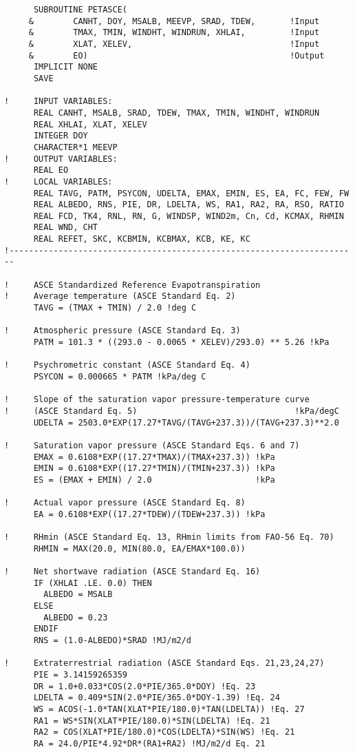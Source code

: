 \begin{verbatim}
      SUBROUTINE PETASCE(
     &        CANHT, DOY, MSALB, MEEVP, SRAD, TDEW,       !Input
     &        TMAX, TMIN, WINDHT, WINDRUN, XHLAI,         !Input
     &        XLAT, XELEV,                                !Input
     &        EO)                                         !Output
      IMPLICIT NONE
      SAVE

!     INPUT VARIABLES:
      REAL CANHT, MSALB, SRAD, TDEW, TMAX, TMIN, WINDHT, WINDRUN
      REAL XHLAI, XLAT, XELEV
      INTEGER DOY
      CHARACTER*1 MEEVP
!     OUTPUT VARIABLES:
      REAL EO
!     LOCAL VARIABLES:
      REAL TAVG, PATM, PSYCON, UDELTA, EMAX, EMIN, ES, EA, FC, FEW, FW
      REAL ALBEDO, RNS, PIE, DR, LDELTA, WS, RA1, RA2, RA, RSO, RATIO
      REAL FCD, TK4, RNL, RN, G, WINDSP, WIND2m, Cn, Cd, KCMAX, RHMIN
      REAL WND, CHT
      REAL REFET, SKC, KCBMIN, KCBMAX, KCB, KE, KC
!-----------------------------------------------------------------------

!     ASCE Standardized Reference Evapotranspiration
!     Average temperature (ASCE Standard Eq. 2)
      TAVG = (TMAX + TMIN) / 2.0 !deg C

!     Atmospheric pressure (ASCE Standard Eq. 3)
      PATM = 101.3 * ((293.0 - 0.0065 * XELEV)/293.0) ** 5.26 !kPa

!     Psychrometric constant (ASCE Standard Eq. 4)
      PSYCON = 0.000665 * PATM !kPa/deg C

!     Slope of the saturation vapor pressure-temperature curve
!     (ASCE Standard Eq. 5)                                !kPa/degC
      UDELTA = 2503.0*EXP(17.27*TAVG/(TAVG+237.3))/(TAVG+237.3)**2.0

!     Saturation vapor pressure (ASCE Standard Eqs. 6 and 7)
      EMAX = 0.6108*EXP((17.27*TMAX)/(TMAX+237.3)) !kPa
      EMIN = 0.6108*EXP((17.27*TMIN)/(TMIN+237.3)) !kPa
      ES = (EMAX + EMIN) / 2.0                     !kPa

!     Actual vapor pressure (ASCE Standard Eq. 8)
      EA = 0.6108*EXP((17.27*TDEW)/(TDEW+237.3)) !kPa

!     RHmin (ASCE Standard Eq. 13, RHmin limits from FAO-56 Eq. 70)
      RHMIN = MAX(20.0, MIN(80.0, EA/EMAX*100.0))

!     Net shortwave radiation (ASCE Standard Eq. 16)
      IF (XHLAI .LE. 0.0) THEN
        ALBEDO = MSALB
      ELSE
        ALBEDO = 0.23
      ENDIF
      RNS = (1.0-ALBEDO)*SRAD !MJ/m2/d

!     Extraterrestrial radiation (ASCE Standard Eqs. 21,23,24,27)
      PIE = 3.14159265359
      DR = 1.0+0.033*COS(2.0*PIE/365.0*DOY) !Eq. 23
      LDELTA = 0.409*SIN(2.0*PIE/365.0*DOY-1.39) !Eq. 24
      WS = ACOS(-1.0*TAN(XLAT*PIE/180.0)*TAN(LDELTA)) !Eq. 27
      RA1 = WS*SIN(XLAT*PIE/180.0)*SIN(LDELTA) !Eq. 21
      RA2 = COS(XLAT*PIE/180.0)*COS(LDELTA)*SIN(WS) !Eq. 21
      RA = 24.0/PIE*4.92*DR*(RA1+RA2) !MJ/m2/d Eq. 21


\end{verbatim}
